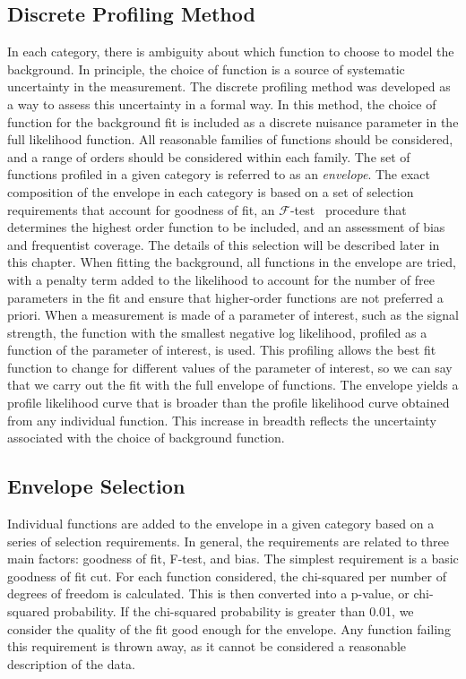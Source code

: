 \subsection{Discrete Profiling Method}\label{sec:envelope}
In each category, there is ambiguity about which function to choose to model the background. 
In principle, the choice of function is a source of systematic uncertainty in the measurement. 
The discrete profiling method was developed as a way to assess this uncertainty in a formal way. 
In this method, the choice of function for the background fit is included as a 
discrete nuisance parameter in the full likelihood function. All reasonable families of 
functions should be considered, and a range of orders should be considered within each family. 
The set of functions profiled in a given category is referred to as an \textit{envelope}.
The exact composition of the envelope in each category
is based on a set of selection requirements that account for goodness of fit, an $\mathcal{F}$-test~\cite{Fisher:1922saa} procedure that determines the highest order function to be included, 
and an assessment of bias and frequentist coverage. The details of this selection will be described later in this chapter.
When fitting the background, all functions in the envelope are tried, with a penalty term added to the likelihood 
to account for the number of free parameters in the fit and ensure that higher-order functions are not preferred a priori. When a measurement is made of 
a parameter of interest, such as the signal strength, the function with the smallest negative log likelihood, 
profiled as a function of the parameter of interest, is used. This profiling allows the best fit function to change for 
different values of the parameter of interest, so we can say that we carry out the fit with the full envelope of functions.  
The envelope yields a profile likelihood curve that is broader than the profile likelihood curve obtained from any individual function. 
This increase in breadth reflects the uncertainty associated with the choice of background function. 

\subsection{Envelope Selection}\label{sec:envelope_selection}
Individual functions are added to the envelope in a given category based on a series of selection requirements. In general, 
the requirements are related to three main factors: goodness of fit, F-test, and bias. The simplest requirement is a basic 
goodness of fit cut. For each function considered, the chi-squared per number of degrees of freedom is calculated. This is 
then converted into a p-value, or chi-squared probability. If the chi-squared probability is greater than 0.01, we consider 
the quality of the fit good enough for the envelope. Any function failing this requirement is thrown away, as it cannot
be considered a reasonable description of the data. 

